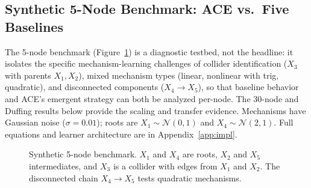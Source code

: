 \documentclass{article}
\theoremstyle{plain}
\theoremstyle{definition}
\theoremstyle{remark}
\begin{document}
\subsection{Synthetic 5-Node Benchmark: ACE vs.\ Five Baselines}
\label{sec:results-main}

The 5-node benchmark (Figure~\ref{fig:synthetic-scm}) is a diagnostic testbed, not the headline: it isolates the specific mechanism-learning challenges of collider identification ($X_3$ with parents $X_1, X_2$), mixed mechanism types (linear, nonlinear with trig, quadratic), and disconnected components ($X_4 \to X_5$), so that baseline behavior and ACE's emergent strategy can both be analyzed per-node. The 30-node and Duffing results below provide the scaling and transfer evidence. Mechanisms have Gaussian noise ($\sigma = 0.01$); roots are $X_1 \sim \mathcal{N}(0,1)$ and $X_4 \sim \mathcal{N}(2,1)$. Full equations and learner architecture are in Appendix~\ref{app:impl}.

\begin{figure}[t]
\centering
{}
\caption{Synthetic 5-node benchmark. $X_1$ and $X_4$ are roots, $X_2$ and $X_5$ intermediates, and $X_3$ is a collider with edges from $X_1$ and $X_2$. The disconnected chain $X_4 \to X_5$ tests quadratic mechanisms.}
\label{fig:synthetic-scm}
\end{figure}
\end{document}
